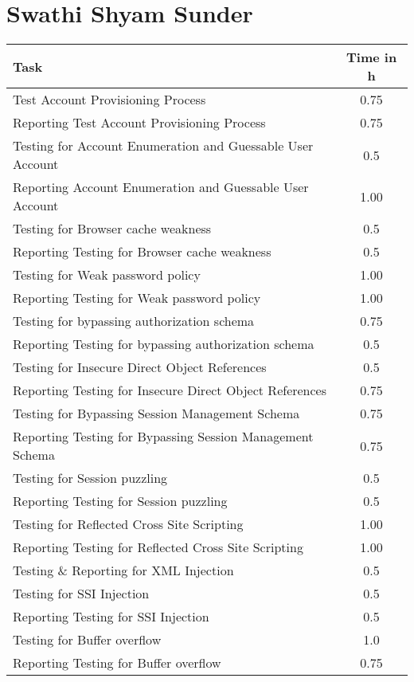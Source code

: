 \section{Swathi Shyam Sunder}
\begin{table}[H]
\tiny
\begin{tabular*}{\textwidth}{@{\extracolsep{\fill}} l c@{\extracolsep{0pt}} }
\textbf{Task} & \textbf{Time in h} \\ \hline
Test Account Provisioning Process 		    & 0.75 \\
Reporting Test Account Provisioning Process	& 0.75 \\
Testing for Account Enumeration and Guessable User Account & 0.5 \\
Reporting Account Enumeration and Guessable User Account & 1.00 \\
Testing for Browser cache weakness 			& 0.5 \\
Reporting Testing for Browser cache weakness & 0.5 \\
Testing for Weak password policy 		    & 1.00 \\
Reporting Testing for Weak password policy  & 1.00 \\
Testing for bypassing authorization schema  & 0.75 \\
Reporting Testing for bypassing authorization schema & 0.5 \\
Testing for Insecure Direct Object References & 0.5 \\
Reporting Testing for Insecure Direct Object References & 0.75 \\
Testing for Bypassing Session Management Schema	& 0.75 \\
Reporting Testing for Bypassing Session Management Schema & 0.75 \\
Testing for Session puzzling		        & 0.5 \\
Reporting Testing for Session puzzling		& 0.5 \\
Testing for Reflected Cross Site Scripting	& 1.00 \\
Reporting Testing for Reflected Cross Site Scripting & 1.00 \\
Testing \& Reporting for XML Injection		& 0.5 \\
Testing for SSI Injection					& 0.5 \\
Reporting Testing for SSI Injection 		& 0.5 \\
Testing for Buffer overflow		            & 1.0 \\
Reporting Testing for Buffer overflow       & 0.75 \\

\end{tabular*}
\end{table}
